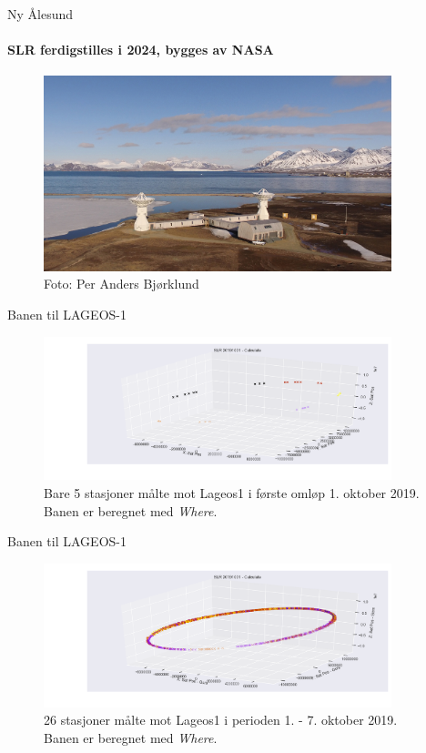 \documentclass[12pt,table,t]{beamer}
\begin{document}
\begin{frame}{Ny Ålesund}
  \framesubtitle{SLR ferdigstilles i 2024, bygges av NASA}
  \begin{figure}
    \includegraphics[width=0.9\textwidth]{figure/PAB_jordobservatoriet.jpg}\caption{Foto: Per Anders Bjørklund}
  \end{figure}
\end{frame}


\begin{frame}{Banen til LAGEOS-1}
  \begin{figure}
    \includegraphics[width=0.9\textwidth]{figure/orbit_l1_4h.png}\caption{Bare 5 stasjoner målte mot Lageos1 i første omløp 1. oktober 2019. Banen er beregnet med {\it Where}.}
  \end{figure}
\end{frame}


\begin{frame}{Banen til LAGEOS-1}
  \begin{figure}
    \includegraphics[width=0.9\textwidth]{figure/orbit_l1_week.png}\caption{26 stasjoner målte mot Lageos1 i perioden 1. - 7. oktober 2019. Banen er beregnet med {\it Where}.}
  \end{figure}
\end{frame}
\end{document}
